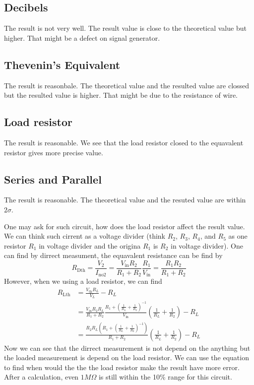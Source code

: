 \documentclass[aps,prl,reprint]{revtex4-1}
\begin{document}
    \subsection{Decibels}
    The result is not very well. The result value is close to the theoretical value but higher. That might be a defect on signal generator.
    \subsection{Thevenin's Equivalent}
    The result is reasonbale. The theoretical value and the resulted value are clossed but the resulted value is higher. That might be due to the resistance of wire.
    \subsection{Load resistor}
    The result is reasonable. We see that the load resistor closed to the equavalent resistor gives more precise value.

    \subsection{Series and Parallel}
    The result is reasonable. The theoretical value and the resuted value are within $2\sigma$.

    One may ask for such circuit, how does the load resistor affect the result value. We can think such cirrent as a voltage divider (think $R_2$, $R_3$, $R_4$, and $R_5$ as one resistor $R_1$ in voltage divider and the origina $R_1$ is $R_2$ in voltage divider). One can find by dirrect measument, the equavalent resistance can be find by
    \[
    R_\text{Dth} = \frac{V_2}{I_\text{no2}} = \frac{V_\text{in} R_2}{R_1 + R_2} \frac{R_1}{V_\text{in}} = \frac{R_1R_2}{R_1+R_2}
    \]
    However, when we using a load resistor, we can find 
    \begin{align*}
        R_\text{Lth} &= \frac{V_\text{th} R_L}{V_L} - R_L \\
        &= \frac{V_\text{in} R_2 R_L}{R_1+R_2}
        \frac{ R_1+(\frac{1}{R_L} + \frac{1}{R_2})^{-1}}
        {V_\text{in}} (\frac{1}{R_L} + \frac{1}{R_2}) - R_L\\
        &= \frac{R_2 R_L (R_1+(\frac{1}{R_L} + \frac{1}{R_2})^{-1})}{R_1+R_2} (\frac{1}{R_L} + \frac{1}{R_2}) - R_L
    \end{align*}
    Now we can see that the dirrect measurement is not depend on the anything but the loaded measurement is depend on the load resistor. We can use the equation to find when would the the the load resistor make the result have more error. After a calculation, even $1M\Omega$ is still within the 10\% range for this circuit.
\end{document}
